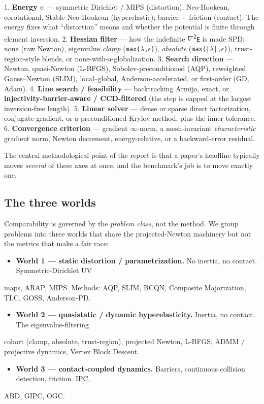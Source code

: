 \documentclass{egpubl}
\begin{document}
1. \textbf{Energy} \texttt{$\psi$} --- symmetric Dirichlet / MIPS (distortion); Neo-Hookean, corotational, Stable
   Neo-Hookean (hyperelastic); barrier + friction (contact). The energy fixes what ``distortion'' means
   and whether the potential is finite through element inversion.
2. \textbf{Hessian filter} --- how the indefinite \texttt{$\nabla$\textsuperscript{2}E} is made SPD: none (raw Newton), eigenvalue \emph{clamp}
   (\texttt{max($\lambda$,$\epsilon$)}), \emph{absolute} (\texttt{max(|$\lambda$|,$\epsilon$)}), trust-region-style blends, or none-with-a-globalization.
3. \textbf{Search direction} --- Newton, quasi-Newton (L-BFGS), Sobolev-preconditioned (AQP), reweighted
   Gauss--Newton (SLIM), local--global, Anderson-accelerated, or first-order (GD, Adam).
4. \textbf{Line search / feasibility} --- backtracking Armijo, exact, or \textbf{injectivity-barrier-aware /
   CCD-filtered} (the step is capped at the largest inversion-free length).
5. \textbf{Linear solver} --- dense or sparse direct factorization, conjugate gradient, or a
   preconditioned Krylov method, plus the inner tolerance.
6. \textbf{Convergence criterion} --- gradient $\infty$-norm, a mesh-invariant \emph{characteristic} gradient norm,
   Newton decrement, energy-relative, or a backward-error residual.

The central methodological point of the report is that a paper's headline typically moves \emph{several} of
these axes at once, and the benchmark's job is to move exactly one.

\subsection{The three worlds}

Comparability is governed by the \emph{problem class}, not the method. We group problems into three worlds
that share the projected-Newton machinery but not the metrics that make a fair race:

\begin{itemize}
  \item \textbf{World 1 --- static distortion / parametrization.} No inertia, no contact. Symmetric-Dirichlet UV
\end{itemize}
  maps, ARAP, MIPS. Methods: AQP, SLIM, BCQN, Composite Majorization, TLC, GOSS, Anderson-PD.
\begin{itemize}
  \item \textbf{World 2 --- quasistatic / dynamic hyperelasticity.} Inertia, no contact. The eigenvalue-filtering
\end{itemize}
  cohort (clamp, absolute, trust-region), projected Newton, L-BFGS, ADMM / projective dynamics,
  Vertex Block Descent.
\begin{itemize}
  \item \textbf{World 3 --- contact-coupled dynamics.} Barriers, continuous collision detection, friction. IPC,
\end{itemize}
  ABD, GIPC, OGC.
\end{document}
